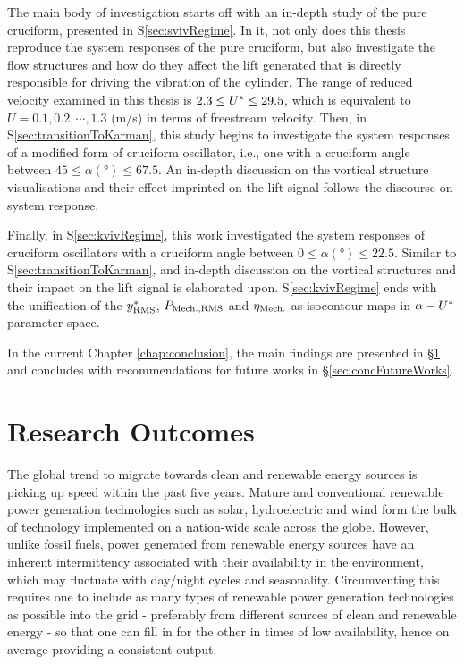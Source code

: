 \documentclass[oneside]{utmthesis}
\begin{document}
The main body of investigation starts off with an in-depth study of the pure cruciform, presented in S\ref{sec:svivRegime}. In it, not only does this thesis reproduce the system responses of the pure cruciform, but also investigate the flow structures and how do they affect the lift generated that is directly responsible for driving the vibration of the cylinder. The range of reduced velocity examined in this thesis is $2.3 \leq U^{*} \leq 29.5$, which is equivalent to $U = 0.1, 0.2, \cdots, 1.3$ (m/s) in terms of freestream velocity. Then, in S\ref{sec:transitionToKarman}, this study begins to investigate the system responses of a modified form of cruciform oscillator, i.e., one with a cruciform angle between $45 \leq \alpha (\si{\degree}) \leq 67.5$. An in-depth discussion on the vortical structure visualisations and their effect imprinted on the lift signal follows the discourse on system response.

Finally, in S\ref{sec:kvivRegime}, this work investigated the system responses of cruciform oscillators with a cruciform angle between $0 \leq \alpha (\si{\degree}) \leq 22.5$. Similar to S\ref{sec:transitionToKarman}, and in-depth discussion on the vortical structures and their impact on the lift signal is elaborated upon. S\ref{sec:kvivRegime} ends with the unification of the $y^{*}_{\text{RMS}}$, $P_{\text{Mech.,RMS}}$ and $\eta_{\text{Mech.}}$ as isocontour maps in $\alpha - U^{*}$ parameter space. 

In the current Chapter \ref{chap:conclusion}, the main findings are presented in \S\ref{sec:concResearchOutcome} and concludes with recommendations for future works in \S\ref{sec:concFutureWorks}.

\section{Research Outcomes} \label{sec:concResearchOutcome}
The global trend to migrate towards clean and renewable energy sources is picking up speed within the past five years. Mature and conventional renewable power generation technologies such as solar, hydroelectric and wind form the bulk of technology implemented on a nation-wide scale across the globe. However, unlike fossil fuels, power generated from renewable energy sources have an inherent intermittency associated with their availability in the environment, which may fluctuate with day/night cycles and seasonality. Circumventing this requires one to include as many types of renewable power generation technologies as possible into the grid - preferably from different sources of clean and renewable energy - so that one can fill in for the other in times of low availability, hence on average providing a consistent output.
\end{document}
